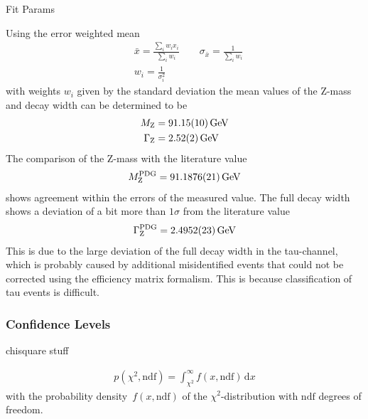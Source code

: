 \documentclass[11pt, a4paper]{article}
\numberwithin{equation}{section}
\newcommand\dinf[1]{ \,\mathrm{d}#1 }
\begin{document}
\begin{table}
	\centering
	
	\caption{Fit Params}
\end{table}

Using the error weighted mean
\begin{align*}
	&\bar{x} = \frac{\sum_i w_i x_i}{\sum_i w_i} \qquad \sigma_{\bar{x}} = \frac{1}{\sum_i w_i}\\
	&w_i = \frac{1}{\sigma_i^2} 	
\end{align*}
with weights $w_i$ given by the standard deviation the mean values of the Z-mass and decay width can be determined to be
\begin{align*}
	M_\mathrm{Z} &= \SI{91.15 +- 0.10}{GeV}\\
	\Gamma_\mathrm{Z} &= \SI{2.52 +- 0.02}{GeV} 
\end{align*}
The comparison of the Z-mass with the literature value \cite{pdg}
\begin{align*}
	M_\mathrm{Z}^\mathrm{PDG} = \SI{91.1876 +- 0.0021}{GeV}
\end{align*}
shows agreement within the errors of the measured value.
The full decay width shows a deviation of a bit more than $1\sigma$ from the literature value \cite{pdg}
\begin{align*}
	\Gamma_\mathrm{Z}^\mathrm{PDG} = \SI{2.4952 +- 0.0023}{GeV}
\end{align*}
This is due to the large deviation of the full decay width in the tau-channel, which is probably caused by additional misidentified events that could not be corrected using the efficiency matrix formalism.
This is because classification of tau events is difficult.

\subsubsection{Confidence Levels}
\begin{table}
	\centering
	
	\caption{chisquare stuff}
\end{table}

\begin{align*}
	p(\chi^2, \mathrm{ndf}) = \int_{\chi^2}^\infty f(x, \mathrm{ndf}) \dinf{x}
\end{align*}
with the probability density~$f(x, \mathrm{ndf})$ of the $\chi^2$-distribution with $\mathrm{ndf}$ degrees of freedom.
\end{document}
